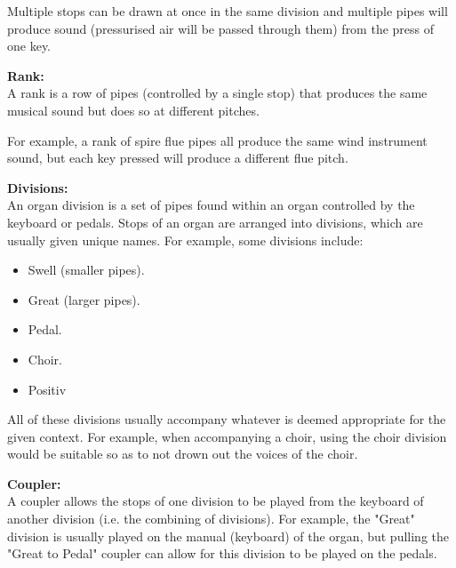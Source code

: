 Multiple stops can be drawn at once in the same division and multiple pipes will produce sound (pressurised air will be passed through them) from the press of one key. \cite{organvideo}

\medskip
\noindent \textbf{Rank:}
\\ \hspace*{0.5cm} A rank is a row of pipes (controlled by a single stop) that produces the same musical sound but does so at different pitches. 

For example, a rank of spire flue pipes all produce the same wind instrument sound, but each key pressed will produce a different flue pitch.  \cite{organvideo}

\medskip
\noindent \textbf{Divisions:}
\\ \hspace*{0.5cm} An organ division is a set of pipes found within an organ controlled by the keyboard or pedals. Stops of an organ are arranged into divisions, which are usually given unique names. For example, some divisions include:

\vspace{-0.15cm}
\begin{itemize}
    \itemsep0em 
\item Swell (smaller pipes).
\vspace{-0.1cm}
\item Great (larger pipes).
\vspace{-0.1cm}
\item Pedal.
\vspace{-0.1cm}
\item Choir.
\vspace{-0.1cm}
\item Positiv
\end{itemize}
\vspace{-0.15cm}

All of these divisions usually accompany whatever is deemed appropriate for the given context. For example, when accompanying a choir, using the choir division would be suitable so as to not drown out the voices of the choir. \cite{organvideo}

\medskip
\noindent \textbf{Coupler:}
\\ \hspace*{0.5cm} A coupler allows the stops of one division to be played from the keyboard of another division (i.e. the combining of divisions). For example, the "Great" division is usually played on the manual (keyboard) of the organ, but pulling the "Great to Pedal" coupler can allow for this division to be played on the pedals. \cite{organvideo}

